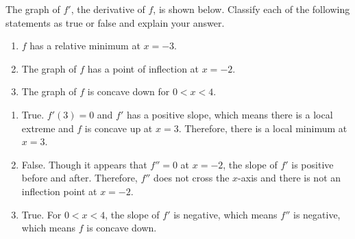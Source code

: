 \begin{Exercise} The graph of $f'$, 
the derivative of $f$, is shown below. Classify each of the following 
statements as true or false and explain your answer. 

\begin{enumerate}
\item $f$ has a relative minimum at $x = -3$.
\item The graph of $f$ has a point of inflection at $x = -2$.
\item The graph of $f$ is concave down for $0 < x < 4$.
\end{enumerate}

\end{Exercise}

\begin{Answer}[ref = shape2]
\begin{enumerate}
\item True. $f'(3) = 0$ and $f'$ has a positive slope, which means there is a 
local extreme and $f$ is concave up at $x = 3$. Therefore, there is a local 
minimum at $x = 3$.
\item False. Though it appears that $f'' = 0$ at $x = -2$, the slope of $f'$ 
is positive before and after. Therefore, $f''$ does not cross the $x$-axis 
and there is not an inflection point at $x = -2$. 
\item True. For $ 0 < x < 4$, the slope of $f'$ is negative, which means 
$f''$ is negative, which means $f$ is concave down. 
\end{enumerate}
\end{Answer}

